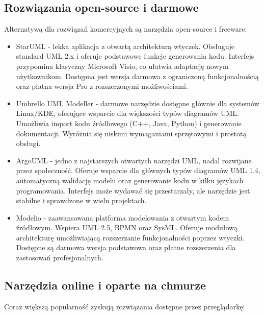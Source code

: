 \documentclass[12pt,a4paper]{article}
\begin{document}
\subsection{Rozwiązania open-source i darmowe}
Alternatywą dla rozwiązań komercyjnych są narzędzia open-source i freeware:

\begin{itemize}
    \item StarUML - lekka aplikacja z otwartą architekturą wtyczek. Obsługuje standard UML 2.x i oferuje podstawowe funkcje generowania kodu. Interfejs przypomina klasyczny Microsoft Visio, co ułatwia adaptację nowym użytkownikom. Dostępna jest wersja darmowa z ograniczoną funkcjonalnością oraz płatna wersja Pro z rozszerzonymi możliwościami.
    
    \item Umbrello UML Modeller - darmowe narzędzie dostępne głównie dla systemów Linux/KDE, oferujące wsparcie dla większości typów diagramów UML. Umożliwia import kodu źródłowego (C++, Java, Python) i generowanie dokumentacji. Wyróżnia się niskimi wymaganiami sprzętowymi i prostotą obsługi.
    
    \item ArgoUML - jedno z najstarszych otwartych narzędzi UML, nadal rozwijane przez społeczność. Oferuje wsparcie dla głównych typów diagramów UML 1.4, automatyczną walidację modelu oraz generowanie kodu w kilku językach programowania. Interfejs może wydawać się przestarzały, ale narzędzie jest stabilne i sprawdzone w wielu projektach.
    
    \item Modelio - zaawansowana platforma modelowania z otwartym kodem źródłowym. Wspiera UML 2.5, BPMN oraz SysML. Oferuje modułową architekturę umożliwiającą rozszerzanie funkcjonalności poprzez wtyczki. Dostępne są darmowa wersja podstawowa oraz płatne rozszerzenia dla zastosowań profesjonalnych.
\end{itemize}

\subsection{Narzędzia online i oparte na chmurze}
Coraz większą popularność zyskują rozwiązania dostępne przez przeglądarkę:
\end{document}
